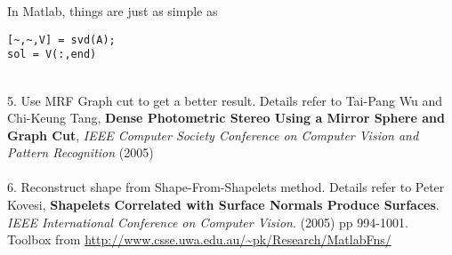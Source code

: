 \documentclass [12pt] {article}
\begin{document}
\begin{spacing}{1.5}
In Matlab, things are just as simple as
\lstset{basicstyle=\footnotesize\ttfamily,breaklines=true}
\lstset{framextopmargin=50pt}
 \begin{lstlisting}
[~,~,V] = svd(A);
sol = V(:,end)
  \end{lstlisting}
~\\
5. Use MRF Graph cut to get a better result. Details refer to Tai-Pang Wu and Chi-Keung Tang, \textbf{Dense Photometric Stereo Using a Mirror Sphere and Graph Cut}, \emph{IEEE Computer Society Conference on Computer Vision and Pattern Recognition} (2005)\\
~\\
6. Reconstruct shape from Shape-From-Shapelets method. Details refer to Peter Kovesi, \textbf{Shapelets Correlated with Surface Normals Produce Surfaces}. \emph{IEEE International Conference on Computer Vision}. (2005) pp 994-1001. Toolbox from \url{http://www.csse.uwa.edu.au/~pk/Research/MatlabFns/}\\
\end {spacing}
\end{document}
